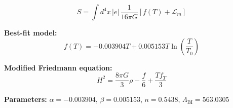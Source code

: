 
\begin{equation}
  S = \int d^4x \, |e| \, \frac{1}{16\pi G} \left[ f(T) + \mathcal{L}_m \right]
\end{equation}

\textbf{Best-fit model:}
\begin{equation}
  f(T) = -0.003904 T + 0.005153 T \ln\!\left(\frac{T}{T_0}\right)
\end{equation}

\textbf{Modified Friedmann equation:}
\begin{equation}
  H^2 = \frac{8\pi G}{3} \rho - \frac{f}{6} + \frac{T f_T}{3}
\end{equation}

\textbf{Parameters:}
$\alpha = -0.003904$, \quad
$\beta = 0.005153$, \quad
$n = 0.5438$, \quad
$\Lambda_{\text{BI}} = 563.0305$
